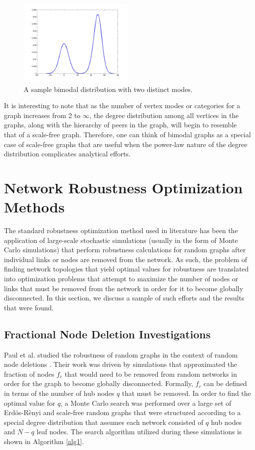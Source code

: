 \documentclass[doc]{apa}%
\begin{document}
\begin{figure}[h!]
	\label{fig:bimodalDist}
	\centering
		\includegraphics[width=0.5\textwidth]{bimodal.jpg}
	\caption{A sample bimodal distribution with two distinct modes.}
\end{figure}

It is interesting to note that as the number of vertex modes or categories for a graph increases from $2$ to $\infty$, the degree distribution among all vertices in the graphs, along with the hierarchy of peers in the graph, will begin to resemble that of a scale-free graph. Therefore, one can think of bimodal graphs as a special case of scale-free graphs that are useful when the power-law nature of the degree distribution complicates analytical efforts.

\section{Network Robustness Optimization Methods}

The standard robustness optimization method used in literature has been the application of large-scale stochastic simulations (usually in the form of Monte Carlo simulations) that perform robustness calculations for random graphs after individual links or nodes are removed from the network. As such, the problem of finding network topologies that yield optimal values for robustness are translated into optimization problems that attempt to maximize the number of nodes or links that must be removed from the network in order for it to become globally disconnected. In this section, we discuss a sample of such efforts and the results that were found.

\subsection{Fractional Node Deletion Investigations} 
Paul et al. studied the robustness of random graphs in the context of random node deletions \cite{Paul}. Their work was driven by simulations that approximated the fraction of nodes $f_c$ that would need to be removed from random networks in order for the graph to become globally disconnected. Formally, $f_c$ can be defined in terms of the number of hub nodes $q$ that must be removed. In order to find the optimal value for $q$, a Monte Carlo search was performed over a large set of Erd\"{o}s-R\`{e}nyi and scale-free random graphs that were structured according to a special degree distribution that assumes each network consisted of $q$ hub nodes and $N - q$ leaf nodes. The search algorithm utilized during these simulations is shown in Algorithm \ref{alg1}. 
\end{document}
